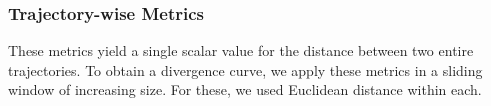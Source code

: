 \documentclass[a4paper,12pt]{article}
\begin{document}
\subsubsection{Trajectory-wise Metrics}
\label{sssec:methods_trajectory_metrics}
These metrics yield a single scalar value for the distance between two entire trajectories. To obtain a divergence curve, we apply these metrics in a sliding window of increasing size. For these, we used Euclidean distance within each.
\end{document}
